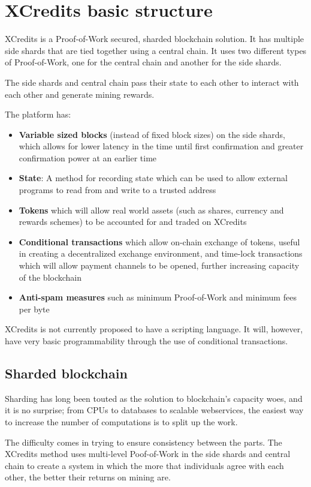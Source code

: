 \documentclass[a4paper,12pt]{article}
\begin{document}
\newpage
\section{XCredits basic structure}
XCredits is a Proof-of-Work secured, sharded blockchain solution. It has multiple side shards that are tied together using a central chain. It uses two different types of Proof-of-Work, one for the central chain and another for the side shards. 

The side shards and central chain pass their state to each other to interact with each other and generate mining rewards. 

The platform has:
\begin{itemize}
  \item \textbf{Variable sized blocks} (instead of fixed block sizes) on the side shards, which allows for lower latency in the time until first confirmation and greater confirmation power at an earlier time 
  \item \textbf{State}: A method for recording state which can be used to allow external programs to read from and write to a trusted address
  \item \textbf{Tokens} which will allow real world assets (such as shares, currency and rewards schemes) to be accounted for and traded on XCredits
  \item \textbf{Conditional transactions} which allow on-chain exchange of tokens, useful in creating a decentralized exchange environment, and time-lock transactions which will allow payment channels to be opened, further increasing capacity of the blockchain
  \item \textbf{Anti-spam measures} such as minimum Proof-of-Work and minimum fees per byte
\end{itemize}

XCredits is not currently proposed to have a scripting language. It will, however, have very basic programmability through the use of conditional transactions. 

\subsection{Sharded blockchain}
Sharding has long been touted as the solution to blockchain's capacity woes, and it is no surprise; from CPUs to databases to scalable webservices, the easiest way to increase the number of computations is to split up the work.

The difficulty comes in trying to ensure consistency between the parts. The XCredits method uses multi-level Poof-of-Work in the side shards and central chain to create a system in which the more that individuals agree with each other, the better their returns on mining are. 
\end{document}
